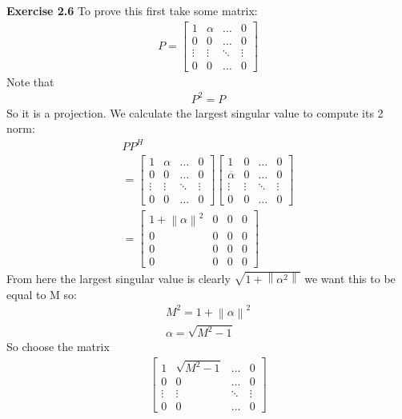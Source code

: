 \documentclass[12pt]{article}
\newenvironment{exercise}[1]{\vspace{.1in}\noindent\textbf{Exercise #1 \hspace{.05em}}}{}
\newcommand{\norm}[1]{\left\lVert#1\right\rVert}
\begin{document}
\begin{exercise}{2.6}
	To prove this first take some matrix:
	\begin{align}
		P=\begin{bmatrix}
			  1      & \alpha & \dots  & 0      \\
			  0      & 0      & \dots  & 0      \\
			  \vdots & \vdots & \ddots & \vdots \\
			  0      & 0      & \dots  & 0
		  \end{bmatrix}
	\end{align}
	Note that
	\begin{align}
		P^2=P
	\end{align}
	So it is a projection. We calculate the largest singular value to compute its 2 norm:
	\begin{align}
		PP^{H}                                                 \\
		=\begin{bmatrix}
			 1      & \alpha & \dots  & 0      \\
			 0      & 0      & \dots  & 0      \\
			 \vdots & \vdots & \ddots & \vdots \\
			 0      & 0      & \dots  & 0
		 \end{bmatrix}
		\begin{bmatrix}
			1                           & 0      & \dots  & 0      \\
			\overline{          \alpha} & 0      & \dots  & 0      \\
			\vdots                      & \vdots & \ddots & \vdots \\
			0                           & 0      & \dots  & 0
		\end{bmatrix} \\
		=%
		\begin{bmatrix}
			1+\norm{\alpha}^2 & 0 & 0 & 0 \\
			0                 & 0 & 0 & 0 \\
			0                 & 0 & 0 & 0 \\
			0                 & 0 & 0 & 0
		\end{bmatrix}
	\end{align}
	From here the largest singular value is clearly $\sqrt{1+\norm{\alpha^2}}$ we want this to be equal to M so:
	\begin{align}
		M^2=1+\norm{\alpha}^2 \\
		\alpha=\sqrt{M^2-1}
	\end{align}
	So choose the matrix
	\begin{align}
		\begin{bmatrix}
			1      & \sqrt{M^2-1} & \dots  & 0      \\
			0      & 0            & \dots  & 0      \\
			\vdots & \vdots       & \ddots & \vdots \\
			0      & 0            & \dots  & 0
		\end{bmatrix}
	\end{align}
\end{exercise}
\end{document}
